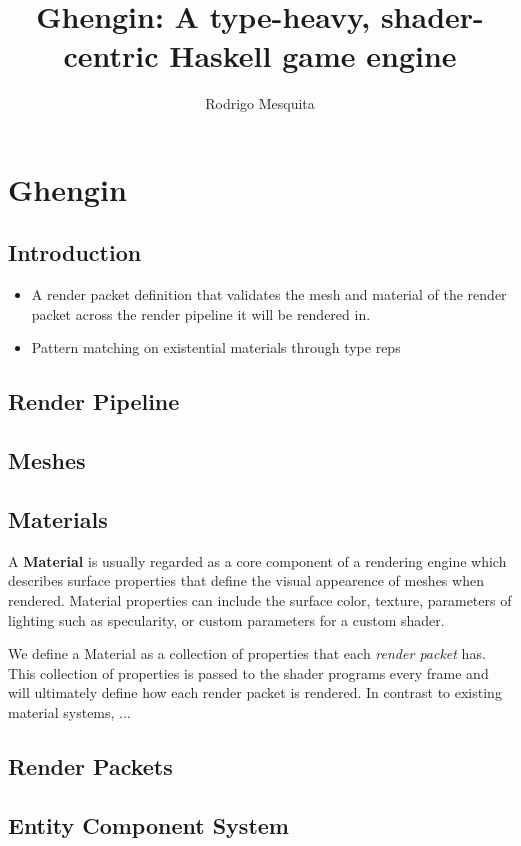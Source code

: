 \documentclass[a4paper,twoside,onecolumn,openright]{memoir}
\title{Ghengin: A type-heavy, shader-centric Haskell game engine}
\author{Rodrigo Mesquita}
\begin{document}
\maketitle

\chapter{Ghengin}

\section{Introduction}

\begin{itemize}
  \item A render packet definition that validates the mesh and material of the
    render packet across the render pipeline it will be rendered in.
  \item Pattern matching on existential materials through type reps
\end{itemize}

\section{Render Pipeline}

\section{Meshes}

\section{Materials}

A \textbf{Material} is usually regarded as a core component of a rendering
engine which describes surface properties that define the visual appearence of
meshes when rendered. Material properties can include the surface color,
texture, parameters of lighting such as specularity, or custom parameters for a
custom shader.

We define a Material as a collection of properties that each \emph{render
packet} has. This collection of properties is passed to the shader programs
every frame and will ultimately define how each render packet is rendered. In
contrast to existing material systems, ...

\section{Render Packets}


\section{Entity Component System\label{sec:ecs}}




\end{document}
